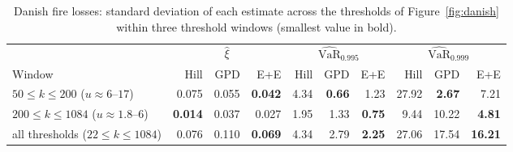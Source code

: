 \begin{table}[t]
\centering
\footnotesize
\setlength{\tabcolsep}{4pt}
\caption{Danish fire losses: standard deviation of each estimate across the thresholds of Figure~\ref{fig:danish} within three threshold windows (smallest value in bold).}
\label{tab:danishsd}
\begin{tabular}{lrrrrrrrrr}
\toprule
 & \multicolumn{3}{c}{$\hat\xi$} & \multicolumn{3}{c}{$\widehat{\mathrm{VaR}}_{0.995}$} & \multicolumn{3}{c}{$\widehat{\mathrm{VaR}}_{0.999}$} \\
\cmidrule(lr){2-4} \cmidrule(lr){5-7} \cmidrule(lr){8-10}
Window & Hill & GPD & E+E & Hill & GPD & E+E & Hill & GPD & E+E \\
\midrule
$50\le k\le 200$ ($u\approx 6$--$17$) & 0.075 & 0.055 & \textbf{0.042} & 4.34 & \textbf{0.66} & 1.23 & 27.92 & \textbf{2.67} & 7.21 \\
$200\le k\le 1084$ ($u\approx 1.8$--$6$) & \textbf{0.014} & 0.037 & 0.027 & 1.95 & 1.33 & \textbf{0.75} & 9.44 & 10.22 & \textbf{4.81} \\
all thresholds ($22\le k\le 1084$) & 0.076 & 0.110 & \textbf{0.069} & 4.34 & 2.79 & \textbf{2.25} & 27.06 & 17.54 & \textbf{16.21} \\
\bottomrule
\end{tabular}
\end{table}
